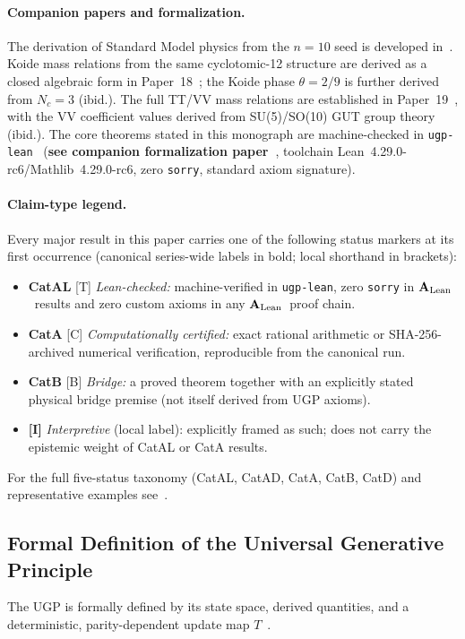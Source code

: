 \documentclass[12pt]{article}
\numberwithin{equation}{section}
\newcommand{\CatAL}{\ensuremath{\textbf{A}_{\rm Lean}}}
\begin{document}
\paragraph{Companion papers and formalization.}
The derivation of Standard Model physics from the $n=10$ seed is developed in~\cite{Spivack2025_ParticlePhysics}.  Koide mass relations from the same cyclotomic-12 structure are derived as a closed algebraic form in Paper~18~\cite{Spivack2026_Koide}; the Koide phase $\theta=2/9$ is further derived from $N_c=3$ (ibid.).  The full TT/VV mass relations are established in Paper~19~\cite{Spivack2026_CyclotomicMass}, with the VV coefficient values derived from SU(5)/SO(10) GUT group theory (ibid.).  The core theorems stated in this monograph are machine-checked in \texttt{ugp-lean}~\cite{ugp-lean} (\textbf{see companion formalization paper~\cite{SpivackUGPFormalization}}, toolchain Lean~4.29.0-rc6/Mathlib~4.29.0-rc6, zero \texttt{sorry}, standard axiom signature).

\paragraph{Claim-type legend.}
Every major result in this paper carries one of the following status markers at its first occurrence (canonical series-wide labels in bold; local shorthand in brackets):
\begin{itemize}[leftmargin=2em,itemsep=0.2em]
    \item \textbf{CatAL} [T] \emph{Lean-checked:} machine-verified in \texttt{ugp-lean}, zero \texttt{sorry} in \CatAL\ results and zero custom axioms in any \CatAL\ proof chain.
    \item \textbf{CatA} [C] \emph{Computationally certified:} exact rational arithmetic or SHA-256-archived numerical verification, reproducible from the canonical run.
    \item \textbf{CatB} [B] \emph{Bridge:} a proved theorem together with an explicitly stated physical bridge premise (not itself derived from UGP axioms).
    \item \textbf{[I]} \emph{Interpretive} (local label): explicitly framed as such; does not carry the epistemic weight of CatAL or CatA results.
\end{itemize}
\noindent For the full five-status taxonomy (CatAL, CatAD, CatA, CatB, CatD) and representative examples see~\cite{Spivack2025_ParticlePhysics}.

\subsection{Formal Definition of the Universal Generative Principle}\label{sec:ugp_formal_def}
The UGP is formally defined by its state space, derived quantities, and a deterministic, parity-dependent update map $T$~\cite{SpivackUGPFormalization,ugp-lean}.
\end{document}

